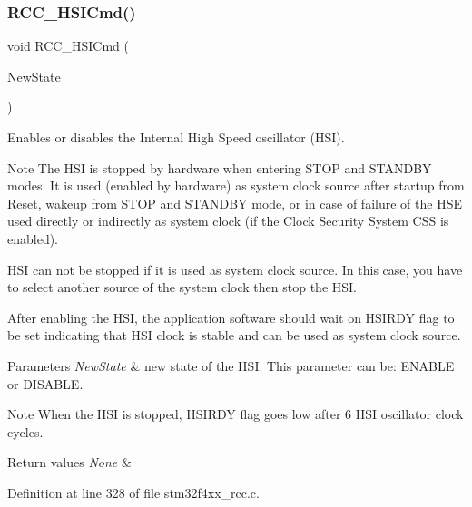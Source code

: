 \subsubsection{\texorpdfstring{R\+C\+C\+\_\+\+H\+S\+I\+Cmd()}{RCC\_HSICmd()}}
{\footnotesize\ttfamily void R\+C\+C\+\_\+\+H\+S\+I\+Cmd (\begin{DoxyParamCaption}\item[{Functional\+State}]{New\+State }\end{DoxyParamCaption})}



Enables or disables the Internal High Speed oscillator (H\+SI). 

\begin{DoxyNote}{Note}
The H\+SI is stopped by hardware when entering S\+T\+OP and S\+T\+A\+N\+D\+BY modes. It is used (enabled by hardware) as system clock source after startup from Reset, wakeup from S\+T\+OP and S\+T\+A\+N\+D\+BY mode, or in case of failure of the H\+SE used directly or indirectly as system clock (if the Clock Security System C\+SS is enabled). 

H\+SI can not be stopped if it is used as system clock source. In this case, you have to select another source of the system clock then stop the H\+SI. 

After enabling the H\+SI, the application software should wait on H\+S\+I\+R\+DY flag to be set indicating that H\+SI clock is stable and can be used as system clock source. 
\end{DoxyNote}

\begin{DoxyParams}{Parameters}
{\em New\+State} & new state of the H\+SI. This parameter can be\+: E\+N\+A\+B\+LE or D\+I\+S\+A\+B\+LE. \\
\hline
\end{DoxyParams}
\begin{DoxyNote}{Note}
When the H\+SI is stopped, H\+S\+I\+R\+DY flag goes low after 6 H\+SI oscillator clock cycles. 
\end{DoxyNote}

\begin{DoxyRetVals}{Return values}
{\em None} & \\
\hline
\end{DoxyRetVals}


Definition at line 328 of file stm32f4xx\+\_\+rcc.\+c.

\mbox{\label{group___r_c_c___group1_ga65209ab5c3589b249c7d70f978735ca6}} 
